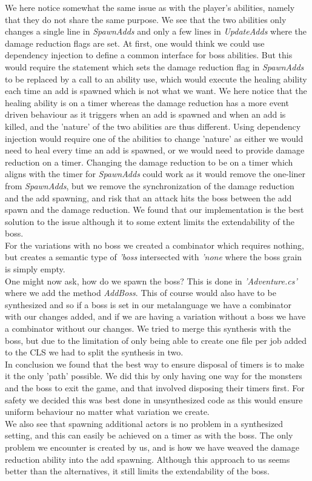 We here notice somewhat the same issue as with the player's abilities, namely that they do not share the same purpose. We see that the two abilities only changes a single line in \textit{SpawnAdds} and only a few lines in \textit{UpdateAdds} where the damage reduction flags are set. At first, one would think we could use dependency injection to define a common interface for boss abilities. But this would require the statement which sets the damage reduction flag in \textit{SpawnAdds} to be replaced by a call to an ability use, which would execute the healing ability each time an add is spawned which is not what we want. We here notice that the healing ability is on a timer whereas the damage reduction has a more event driven behaviour as it triggers when an add is spawned and when an add is killed, and the 'nature' of the two abilities are thus different. Using dependency injection would require one of the abilities to change 'nature' as either we would need to heal every time an add is spawned, or we would need to provide damage reduction on a timer. Changing the damage reduction to be on a timer which aligns with the timer for \textit{SpawnAdds} could work as it would remove the one-liner from \textit{SpawnAdds}, but we remove the synchronization of the damage reduction and the add spawning, and risk that an attack hits the boss between the add spawn and the damage reduction. We found that our implementation is the best solution to the issue although it to some extent limits the extendability of the boss.\\
For the variations with no boss we created a combinator which requires nothing, but creates a semantic type of \textit{'boss} intersected with \textit{'none} where the boss grain is simply empty.\\

One might now ask, how do we spawn the boss? This is done in \textit{'Adventure.cs'} where we add the method \textit{AddBoss}. This of course would also have to be synthesized and so if a boss is set in our metalanguage we have a combinator with our changes added, and if we are having a variation without a boss we have a combinator without our changes. We tried to merge this synthesis with the boss, but due to the limitation of only being able to create one file per job added to the CLS we had to split the synthesis in two.\\

In conclusion we found that the best way to ensure disposal of timers is to make it the only 'path' possible. We did this by only having one way for the monsters and the boss to exit the game, and that involved disposing their timers first. For safety we decided this was best done in unsynthesized code as this would ensure uniform behaviour no matter what variation we create.\\
We also see that spawning additional actors is no problem in a synthesized setting, and this can easily be achieved on a timer as with the boss. The only problem we encounter is created by us, and is how we have weaved the damage reduction ability into the add spawning. Although this approach to us seems better than the alternatives, it still limits the extendability of the boss.